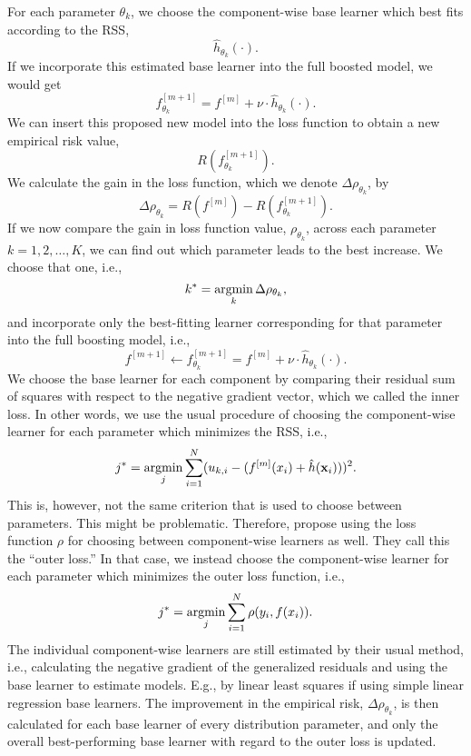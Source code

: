 For each parameter $\theta_k$, we choose the component-wise base learner which best fits according to the RSS,
\begin{equation}
    \hat{h}_{\theta_k}(\cdot).
\end{equation}
If we incorporate this estimated base learner into the full boosted model, we would get
\begin{equation}
    f^{[m+1]}_{\theta_k}=f^{[m]}+\nu\cdot\hat{h}_{\theta_k}(\cdot).
\end{equation}
We can insert this proposed new model into the loss function to obtain a new empirical risk value,
\begin{equation}
    R(f^{[m+1]}_{\theta_k}).
\end{equation}
We calculate the gain in the loss function, which we denote $\Delta\rho_{\theta_k}$, by
\begin{equation}
    \Delta\rho_{\theta_k}=R(f^{[m]})-R(f^{[m+1]}_{\theta_k}).
\end{equation}
If we now compare the gain in loss function value, $\rho_{\theta_k}$, across each parameter $k=1,2,\ldots,K$, we can find out which parameter leads to the best increase. We choose that one, i.e.,
\begin{equation}
    k^*=\operatorname*{argmin}_k\Delta\rho_{\theta_k},
\end{equation}
and incorporate only the best-fitting learner corresponding for that parameter into the full boosting model, i.e.,
\begin{equation}
    f^{[m+1]}\gets f^{[m+1]}_{\theta_k}=f^{[m]}+\nu\cdot\hat{h}_{\theta_k}(\cdot).
\end{equation}
We choose the base learner for each component by comparing their residual sum of squares with respect to the negative gradient vector, which we called the inner loss. In other words, we use the usual procedure of choosing the component-wise learner for each parameter which minimizes the RSS, i.e.,
\begin{equation}
    j^*=\operatorname*{argmin}_{j} \sum_{i=1}^N (u_{k,i}-(f^{[m]}(x_i)+\hat{h}(\mathbf{x}_i)))^2.
\end{equation}
This is, however, not the same criterion that is used to choose between parameters. This might be problematic. Therefore, \citet{thomas2018} propose using the loss function $\rho$ for choosing between component-wise learners as well. They call this the ``outer loss.'' In that case, we instead choose the component-wise learner for each parameter which minimizes the outer loss function, i.e., 
\begin{equation}
    j^*=\operatorname*{argmin}_{j} \sum_{i=1}^N \rho(y_i,f(x_i)).
\end{equation}
The individual component-wise learners are still estimated by their usual method, i.e., calculating the negative gradient of the generalized residuals and using the base learner to estimate models. E.g., by linear least squares if using simple linear regression base learners. The improvement in the empirical risk, $\Delta\rho_{\theta_k}$, is then calculated for each base learner of every distribution parameter, and only the overall best-performing base learner with regard to the outer loss is updated.

